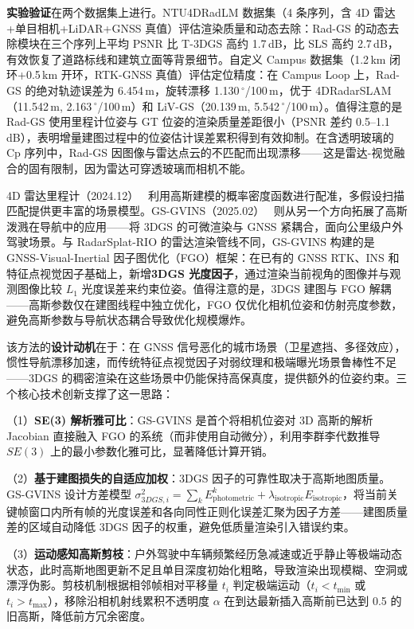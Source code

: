 \textbf{实验验证}在两个数据集上进行。NTU4DRadLM 数据集（4 条序列，含 4D 雷达+单目相机+LiDAR+GNSS 真值）评估渲染质量和动态去除：Rad-GS 的动态去除模块在三个序列上平均 PSNR 比 T-3DGS 高约 1.7\,dB，比 SLS 高约 2.7\,dB，有效恢复了道路标线和建筑立面等背景细节。自定义 Campus 数据集（1.2\,km 闭环+0.5\,km 开环，RTK-GNSS 真值）评估定位精度：在 Campus Loop 上，Rad-GS 的绝对轨迹误差为 6.454\,m，旋转漂移 1.130\,$^\circ$/100\,m，优于 4DRadarSLAM（11.542\,m, 2.163\,$^\circ$/100\,m）和 LiV-GS（20.139\,m, 5.542\,$^\circ$/100\,m）。值得注意的是 Rad-GS 使用里程计位姿与 GT 位姿的渲染质量差距很小（PSNR 差约 0.5--1.1\,dB），表明增量建图过程中的位姿估计误差累积得到有效抑制。在含透明玻璃的 Cp 序列中，Rad-GS 因图像与雷达点云的不匹配而出现漂移——这是雷达-视觉融合的固有限制，因为雷达可穿透玻璃而相机不能。

4D 雷达里程计（2024.12）~\cite{2412_13639} 利用高斯建模的概率密度函数进行配准，多假设扫描匹配提供更丰富的场景模型。GS-GVINS（2025.02）~\cite{2502_10975} 则从另一个方向拓展了高斯泼溅在导航中的应用——将 3DGS 的可微渲染与 GNSS 紧耦合，面向公里级户外驾驶场景。与 RadarSplat-RIO 的雷达渲染管线不同，GS-GVINS 构建的是 GNSS-Visual-Inertial 因子图优化（FGO）框架：在已有的 GNSS RTK、INS 和特征点视觉因子基础上，新增\textbf{3DGS 光度因子}，通过渲染当前视角的图像并与观测图像比较 $L_1$ 光度误差来约束位姿。值得注意的是，3DGS 建图与 FGO 解耦——高斯参数仅在建图线程中独立优化，FGO 仅优化相机位姿和仿射亮度参数，避免高斯参数与导航状态耦合导致优化规模爆炸。

该方法的\textbf{设计动机}在于：在 GNSS 信号恶化的城市场景（卫星遮挡、多径效应），惯性导航漂移加速，而传统特征点视觉因子对弱纹理和极端曝光场景鲁棒性不足——3DGS 的稠密渲染在这些场景中仍能保持高保真度，提供额外的位姿约束。三个核心技术创新支撑了这一思路：

（1）\textbf{SE(3) 解析雅可比}：GS-GVINS 是首个将相机位姿对 3D 高斯的解析 Jacobian 直接融入 FGO 的系统（而非使用自动微分），利用李群李代数推导 $SE(3)$ 上的最小参数化雅可比，显著降低计算开销。

（2）\textbf{基于建图损失的自适应加权}：3DGS 因子的可靠性取决于高斯地图质量。GS-GVINS 设计方差模型 $\sigma^2_{3DGS,i} = \sum_k E^k_{\text{photometric}} + \lambda_{\text{isotropic}} E_{\text{isotropic}}$，将当前关键帧窗口内所有帧的光度误差和各向同性正则化误差汇聚为因子方差——建图质量差的区域自动降低 3DGS 因子的权重，避免低质量渲染引入错误约束。

（3）\textbf{运动感知高斯剪枝}：户外驾驶中车辆频繁经历急减速或近乎静止等极端动态状态，此时高斯地图更新不足且单目深度初始化粗略，导致渲染出现模糊、空洞或漂浮伪影。剪枝机制根据相邻帧相对平移量 $t_i$ 判定极端运动（$t_i < t_{\min}$ 或 $t_i > t_{\max}$），移除沿相机射线累积不透明度 $\alpha$ 在到达最新插入高斯前已达到 0.5 的旧高斯，降低前方冗余密度。

